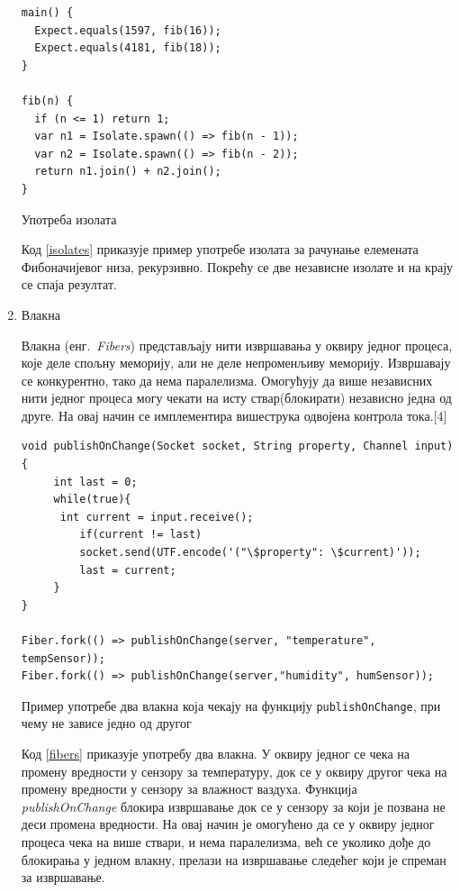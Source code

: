 \documentclass[12pt,oneside]{memoir}
\begin{document}
\begin{enumerate}
\begin{listing}
\begin{verbatim}
main() {
  Expect.equals(1597, fib(16));
  Expect.equals(4181, fib(18)); 
}

fib(n) {
  if (n <= 1) return 1;
  var n1 = Isolate.spawn(() => fib(n - 1));
  var n2 = Isolate.spawn(() => fib(n - 2));
  return n1.join() + n2.join();
}
\end{verbatim}
\caption{Употреба изолата}
\label{isolates}
\end{listing}

Код \ref{isolates} приказује пример употребе изолата за рачунање елемената Фибоначијевог низа, рекурзивно. Покрећу се две независне изолате и на крају се спаја резултат.

\item Влакна

Влакна (енг.~\textit{Fibers}) представљају нити извршавања у оквиру једног процеса, које деле спољну меморију, али не деле непроменљиву меморију. Извршавају се конкурентно, тако да нема паралелизма. Омогућују да више независних нити једног процеса могу чекати на исту ствар(блокирати) независно једна од друге. На овај начин се имплементира вишеструка одвојена контрола тока.[4]%

\begin{listing}
\begin{verbatim}
void publishOnChange(Socket socket, String property, Channel input){
  	 int last = 0;
  	 while(true){
   	  int current = input.receive();
    	 if(current != last)
      	 socket.send(UTF.encode('("\$property": \$current)'));
    	 last = current;
  	 }
}

Fiber.fork(() => publishOnChange(server, "temperature", tempSensor));
Fiber.fork(() => publishOnChange(server,"humidity", humSensor));
\end{verbatim}
\caption{Пример употребе два влакна која чекају на функцију \texttt{publishOnChange}, при чему не зависе једно од другог}
\label{fibers}
\end{listing}

Код \ref{fibers} приказује употребу два влакна. У оквиру једног се чека на промену вредности у сензору за температуру, док се у оквиру другог чека на промену вредности у сензору за влажност ваздуха. Функција \textit{publishOnChange} блокира извршавање док се у сензору за који је позвана не деси промена вредности. На овај начин је омогућено да се у оквиру једног процеса чека на више ствари, и нема паралелизма, већ се уколико дође до блокирања у једном влакну, прелази на извршавање следећег који је спреман за извршавање.


\end{enumerate}
\end{document}
